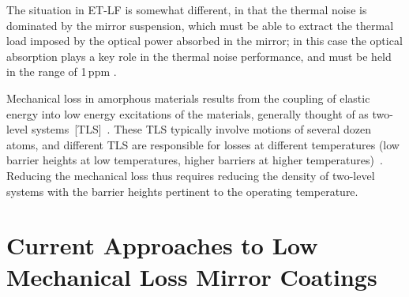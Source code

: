 The situation in ET-LF is somewhat different, in that the thermal noise is dominated by the mirror suspension, which must be able to extract the thermal load imposed by the optical power absorbed in the mirror; in this case the optical absorption plays a key role in the thermal noise performance, and must be held in the range of 1\,ppm \cite{HiEA2011}.


Mechanical loss in amorphous materials results from the coupling of elastic energy into low energy excitations of the materials, generally thought of as two-level systems~[TLS]~\cite{braginsky1985systems,bommel1956dislocations}. These TLS typically involve motions of several dozen atoms, and different TLS are responsible for losses at different temperatures (low barrier heights at low temperatures, higher barriers at higher temperatures)~\cite{hamdan2014molecular,trinastic2016molecular}. Reducing the mechanical loss thus requires reducing the density of two-level systems with the barrier heights pertinent to the operating temperature. 


\section{Current Approaches to Low Mechanical Loss Mirror Coatings}

